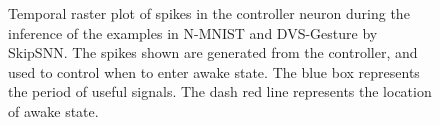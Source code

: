 
\begin{figure}[t]
    \vspace{-5pt}
    \caption{Temporal raster plot of spikes in the controller neuron during the inference of the examples in N-MNIST and DVS-Gesture by SkipSNN. The spikes shown are generated from the controller, and used to control when to enter awake state. The blue box represents the period of useful signals. The dash red line represents the location of awake state. }
    \label{fig:raster}
    \vspace{-10pt}
    \end{figure}
